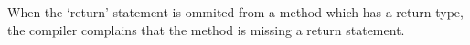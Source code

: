 When the `return' statement is ommited from a method which has a return
type, the compiler complains that the method is missing a return
statement.
